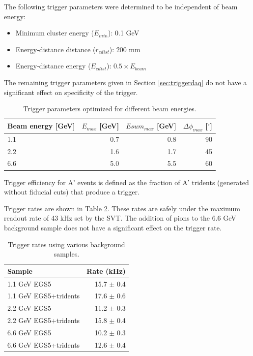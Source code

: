 The following trigger parameters were determined to be independent of beam energy:
\begin{itemize}
	\item Minimum cluster energy ($E_{min}$): 0.1 GeV
	\item Energy-distance distance ($r_{edist}$): 200 mm
	\item Energy-distance energy ($E_{edist}$): $0.5\times E_{beam}$
\end{itemize}

The remaining trigger parameters given in Section \ref{sec:triggerdaq} do not have a significant effect on specificity of the trigger.

\begin{table}
	\begin{tabular}{|l|r|r|r|}
		\hline
		Beam energy [GeV] & $E_{max}$ [GeV] & $Esum_{max}$ [GeV] & $\Delta\phi_{max}$ [$^\circ$] \\
		\hline
		1.1	&	0.7	&	0.8	&	90\\
		2.2	&	1.6	&	1.7	&	45\\
		6.6	&	5.0	&	5.5	&	60\\
		\hline
	\end{tabular}
	\caption{ {\small Trigger parameters optimized for different beam energies.}
	\label{tab:trigcuts}}
\end{table}

Trigger efficiency for A' events is defined as the fraction of A' tridents (generated without fiducial cuts) that produce a trigger.

Trigger rates are shown in Table \ref{tab:trigrates}. These rates are safely under the maximum readout rate of 43 kHz set by the SVT. 
The addition of pions to the 6.6 GeV background sample does not have a significant effect on the trigger rate.

\begin{table}
	\begin{tabular}{|l|r|}
		\hline
		Sample &  Rate (kHz)\\
		\hline
		1.1 GeV	EGS5 				& 15.7 $\pm$ 0.4	\\
		1.1 GeV EGS5+tridents			& 17.6 $\pm$ 0.6	\\
		2.2 GeV	EGS5 				& 11.2 $\pm$ 0.3	\\
		2.2 GeV EGS5+tridents			& 15.8 $\pm$ 0.4	\\
		6.6 GeV	EGS5 				& 10.2 $\pm$ 0.3	\\
		6.6 GeV EGS5+tridents			& 12.6 $\pm$ 0.4	\\
		\hline
	\end{tabular}
	\caption{ {\small Trigger rates using various background samples. }
	\label{tab:trigrates}}
\end{table}


